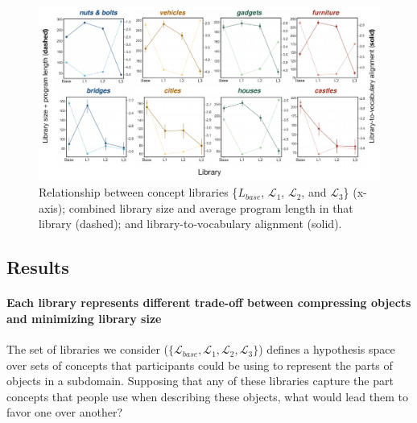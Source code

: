 \documentclass[10pt,letterpaper]{article}
\begin{document}


\begin{figure}[ht!]
  \begin{center}
  \includegraphics[width=0.9\linewidth]{figures/lax_library_costs.pdf}
  \caption{Relationship between concept libraries \{$L_{base}$, $\mathcal{L}_1$, $\mathcal{L}_2$, and $\mathcal{L}_3$\} (x-axis); combined library size and average program length in that library (dashed); and library-to-vocabulary alignment (solid).}\label{fig:perplexity-length}
  \end{center}
\end{figure}

\subsection{Results}
\paragraph{Each library represents different trade-off between compressing objects and minimizing library size} 
The set of libraries we consider ($\{\mathcal{L}_{base}, \mathcal{L}_1, \mathcal{L}_2, \mathcal{L}_3\}$) defines a hypothesis space over sets of concepts that participants could be using to represent the parts of objects in a subdomain. 
Supposing that any of these libraries capture the part concepts that people use when describing these objects, what would lead them to favor one over another?
\end{document}
